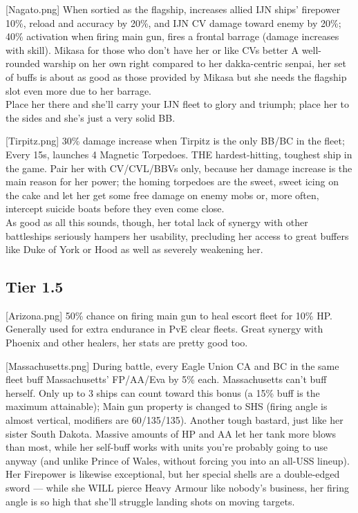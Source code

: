 [Nagato.png]
{When sortied as the flagship, increases allied IJN ships' firepower 10\%, reload and accuracy by 20\%, and IJN CV damage toward enemy by 20\%; 40\% activation when firing main gun, fires a frontal barrage (damage increases with skill).}
{}
{Mikasa for those who don't have her or like CVs better
A well-rounded warship on her own right compared to her dakka-centric senpai, her set of buffs is about as good as those provided by Mikasa but she needs the flagship slot even more due to her barrage.\\
Place her there and she'll carry your IJN fleet to glory and triumph; place her to the sides and she's just a very solid BB.}

[Tirpitz.png]
{30\% damage increase when Tirpitz is the only BB/BC in the fleet; Every 15s, launches 4 Magnetic Torpedoes.}
{}
{THE hardest-hitting, toughest ship in the game. Pair her with CV/CVL/BBVs only, because her damage increase is the main reason for her power; the homing torpedoes are the sweet, sweet icing on the cake and let her get some free damage on enemy mobs or, more often, intercept suicide boats before they even come close.\\
As good as all this sounds, though, her total lack of synergy with other battleships seriously hampers her usability, precluding her access to great buffers like Duke of York or Hood as well as severely weakening her.}

 
\newpage
\subsection{Tier 1.5}
[Arizona.png]
{50\% chance on firing main gun to heal escort fleet for 10\% HP.}
{}
{Generally used for extra endurance in PvE clear fleets. Great synergy with Phoenix and other healers, her stats are pretty good too.}

[Massachusetts.png]
{During battle, every Eagle Union CA and BC in the same fleet buff Massachusetts' FP/AA/Eva by 5\% each. Massachusetts can't buff herself. Only up to 3 ships can count toward this bonus (a 15\% buff is the maximum attainable); Main gun property is changed to SHS (firing angle is almost vertical, modifiers are 60/135/135).}
{}
{Another tough bastard, just like her sister South Dakota. Massive amounts of HP and AA let her tank more blows than most, while her self-buff works with units you're probably going to use anyway (and unlike Prince of Wales, without forcing you into an all-USS lineup). \\
Her Firepower is likewise exceptional, but her special shells are a double-edged sword --- while she WILL pierce Heavy Armour like nobody's business, her firing angle is so high that she'll struggle landing shots on moving targets. }

